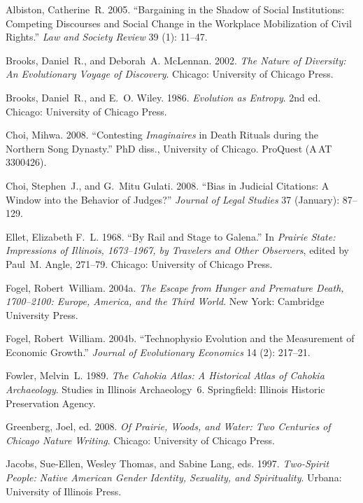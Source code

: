\documentclass[]{interact}
\theoremstyle{plain}%
\theoremstyle{definition}
\theoremstyle{remark}
\begin{document}
\begin{thebibliography}{}

Albiston, Catherine~R. 2005. ``Bargaining in the Shadow of Social Institutions:
 Competing Discourses and Social Change in the Workplace Mobilization of Civil
 Rights.'' \emph{Law and Society Review} 39 (1): 11--47.

Brooks, Daniel~R., and Deborah~A. McLennan. 2002. \emph{The Nature of
 Diversity: An Evolutionary Voyage of Discovery}. Chicago: University of
 Chicago Press.

Brooks, Daniel~R., and E.~O. Wiley. 1986. \emph{Evolution as Entropy}. 2nd ed.
 Chicago: University of Chicago Press.

Choi, Mihwa. 2008. ``Contesting \emph{Imaginaires} in Death Rituals during the
 Northern Song Dynasty.'' PhD diss., University of Chicago. ProQuest
 (A\,AT\,3300426).

Choi, Stephen~J., and G.~Mitu Gulati. 2008. ``Bias in Judicial Citations: A
 Window into the Behavior of Judges?'' \emph{Journal of Legal Studies} 37
 (January): 87--129.

Ellet, Elizabeth F.~L. 1968. ``By Rail and Stage to Galena.'' In \emph{Prairie
 State: Impressions of Illinois, 1673--1967, by Travelers and Other Observers},
 edited by Paul~M. Angle, 271--79. Chicago: University of Chicago Press.

Fogel, Robert~William. 2004a. \emph{The Escape from Hunger and Premature Death,
 1700--2100: Europe, America, and the Third World}. New York: Cambridge
 University Press.

Fogel, Robert~William. 2004b. ``Technophysio Evolution and the Measurement of
 Economic Growth.'' \emph{Journal of Evolutionary Economics} 14 (2): 217--21.

Fowler, Melvin~L. 1989. \emph{The Cahokia Atlas: A Historical Atlas of Cahokia
 Archaeology}. Studies in Illinois Archaeology~6. Springfield: Illinois
 Historic Preservation Agency.

Greenberg, Joel, ed. 2008. \emph{Of Prairie, Woods, and Water: Two Centuries
 of Chicago Nature Writing}. Chicago: University of Chicago Press.

Jacobs, Sue-Ellen, Wesley Thomas, and Sabine Lang, eds. 1997. \emph{Two-Spirit
 People: Native American Gender Identity, Sexuality, and Spirituality}. Urbana:
 University of Illinois Press.


\end{thebibliography}
\end{document}
